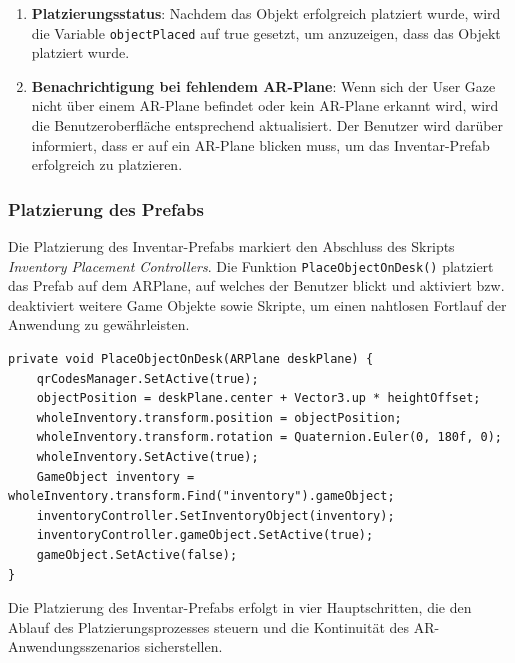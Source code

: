 \begin{enumerate}
    \item \textbf{Platzierungsstatus}: Nachdem das Objekt erfolgreich platziert wurde, wird die Variable \texttt{objectPlaced}
    auf true gesetzt, um anzuzeigen, dass das Objekt platziert wurde.

    \item \textbf{Benachrichtigung bei fehlendem AR-Plane}: Wenn sich der User Gaze nicht über einem AR-Plane befindet oder
    kein AR-Plane erkannt wird, wird die Benutzeroberfläche entsprechend aktualisiert. Der Benutzer wird darüber informiert,
    dass er auf ein AR-Plane blicken muss, um das Inventar-Prefab erfolgreich zu platzieren.
\end{enumerate}

\subsubsection{Platzierung des Prefabs}
Die Platzierung des Inventar-Prefabs markiert den Abschluss des Skripts \textit{Inventory Placement Controllers}. Die
Funktion \texttt{PlaceObjectOnDesk()} platziert das Prefab auf dem ARPlane, auf welches der Benutzer blickt und aktiviert
bzw. deaktiviert weitere Game Objekte sowie Skripte, um einen nahtlosen Fortlauf der Anwendung zu gewährleisten.
\begin{lstlisting}[caption={Funktion zum Platzieren des Inventarobjekts}, label=code:placeObject]
    private void PlaceObjectOnDesk(ARPlane deskPlane) {
    qrCodesManager.SetActive(true);
    objectPosition = deskPlane.center + Vector3.up * heightOffset;
    wholeInventory.transform.position = objectPosition;
    wholeInventory.transform.rotation = Quaternion.Euler(0, 180f, 0);
    wholeInventory.SetActive(true);
    GameObject inventory = wholeInventory.transform.Find("inventory").gameObject;
    inventoryController.SetInventoryObject(inventory);
    inventoryController.gameObject.SetActive(true);
    gameObject.SetActive(false);
}
\end{lstlisting}

Die Platzierung des Inventar-Prefabs erfolgt in vier Hauptschritten, die den Ablauf des Platzierungsprozesses steuern
und die Kontinuität des AR-Anwendungsszenarios sicherstellen.

